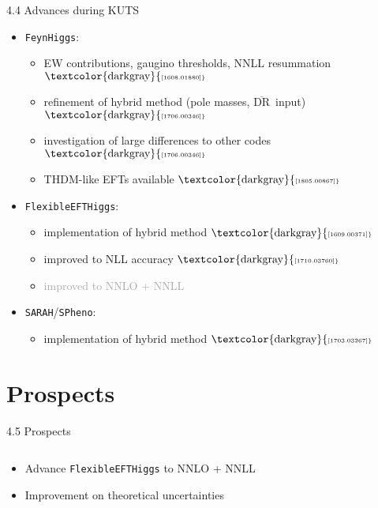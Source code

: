 \documentclass[hyperref={pdfpagelabels=false},ngerman]{beamer}
\newcommand{\mycite}[1]{\ensuremath{\text{\textcolor{darkgray}{\tiny [#1]}}}}
\newcommand{\DRbar}{\ensuremath{\overline{\text{DR}}}}
\newcommand{\feft}{\texttt{FlexibleEFTHiggs}\xspace}
\newcommand{\FH}{\texttt{FeynHiggs}\xspace}
\newcommand{\SPheno}{\texttt{SPheno}\xspace}
\newcommand{\SARAH}{\texttt{SARAH}\xspace}
\begin{document}
\begin{frame}{4.4 Advances during KUTS}
  \begin{itemize}
  \item \FH:
    \begin{itemize}
    \item EW contributions, gaugino thresholds, NNLL resummation \mycite{1608.01880}
    \item refinement of hybrid method (pole masses, \DRbar\ input) \mycite{1706.00346}
    \item investigation of large differences to other codes \mycite{1706.00346}
    \item THDM-like EFTs available \mycite{1805.00867}
  \end{itemize}
  \item \feft:
    \begin{itemize}
    \item implementation of hybrid method \mycite{1609.00371}
    \item improved to NLL accuracy \mycite{1710.03760}
    \item \textcolor{darkgray}{improved to NNLO + NNLL}
  \end{itemize}
  \item \SARAH/\SPheno:
    \begin{itemize}
    \item implementation of hybrid method \mycite{1703.03267}
    \end{itemize}
  \end{itemize}
\end{frame}

\section{Prospects}

\begin{frame}{4.5 Prospects}
    \begin{columns}
    \begin{column}{0.5\textwidth}
      \centering
      \texttt{[image: \{\{plots/kuts-9/4.5]}}}
    \end{column}
    \begin{column}{0.5\textwidth}
      \begin{itemize}
      \item Advance \feft to NNLO + NNLL
      \item Improvement on theoretical uncertainties
      \end{itemize}
    \end{column}
  \end{columns}
\end{frame}
\end{document}
